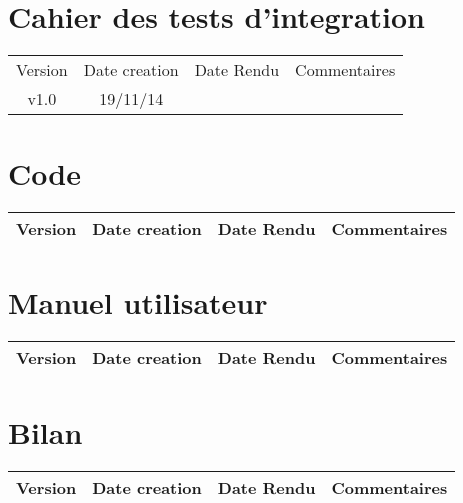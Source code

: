 \documentclass[fleqn, a4paper]{report}
\begin{document}
   \section*{Cahier des tests d'integration}
    \begin{tabular}{|c|c|c|c|}
      \hline
      Version & Date creation & Date Rendu & Commentaires\\
      v1.0 & 19/11/14 & & \\
      \hline
    \end{tabular} 
    
   \section*{Code}
    \begin{tabular}{|c|c|c|c|}
      \hline
      Version & Date creation & Date Rendu & Commentaires\\
      \hline
    \end{tabular}  
    
   \section*{Manuel utilisateur}
    \begin{tabular}{|c|c|c|c|}
      \hline
      Version & Date creation & Date Rendu & Commentaires\\
      \hline
    \end{tabular}  
    
   \section*{Bilan}
    \begin{tabular}{|c|c|c|c|}
      \hline
      Version & Date creation & Date Rendu & Commentaires\\
      \hline
    \end{tabular}  
\end{document}
